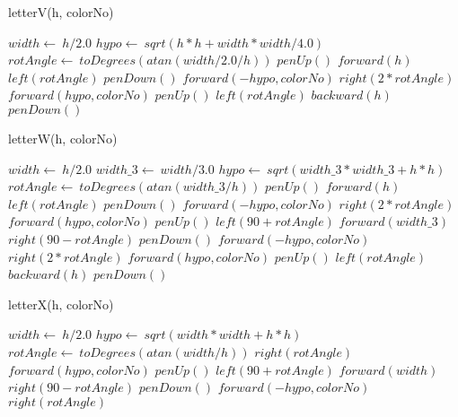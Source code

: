 \documentclass[a4paper,10pt]{article}
\begin{document}
\begin{algorithm}
\caption{letterV(h, colorNo)}
\begin{algorithmic}[5]

\STATE {}
\STATE {}
  \STATE \(width\gets\ h/2.0\)
  \STATE \(hypo\gets\ sqrt(h*h+width*width/4.0)\)
  \STATE \(rotAngle\gets\ toDegrees(atan(width/2.0/h))\)
  \STATE \(penUp()\)
  \STATE \(forward(h)\)
  \STATE \(left(rotAngle)\)
  \STATE \(penDown()\)
  \STATE \(forward(-hypo,colorNo)\)
  \STATE \(right(2*rotAngle)\)
  \STATE \(forward(hypo,colorNo)\)
  \STATE \(penUp()\)
  \STATE \(left(rotAngle)\)
  \STATE \(backward(h)\)
  \STATE \(penDown()\)

\end{algorithmic}
\end{algorithm}


\begin{algorithm}
\caption{letterW(h, colorNo)}
\begin{algorithmic}[5]

\STATE {}
\STATE {}
  \STATE \(width\gets\ h/2.0\)
  \STATE \(width\_3\gets\ width/3.0\)
  \STATE \(hypo\gets\ sqrt(width\_3*width\_3+h*h)\)
  \STATE \(rotAngle\gets\ toDegrees(atan(width\_3/h))\)
  \STATE \(penUp()\)
  \STATE \(forward(h)\)
  \STATE \(left(rotAngle)\)
  \STATE \(penDown()\)
  \STATE \(forward(-hypo,colorNo)\)
  \STATE \(right(2*rotAngle)\)
  \STATE \(forward(hypo,colorNo)\)
  \STATE \(penUp()\)
  \STATE \(left(90+rotAngle)\)
  \STATE \(forward(width\_3)\)
  \STATE \(right(90-rotAngle)\)
  \STATE \(penDown()\)
  \STATE \(forward(-hypo,colorNo)\)
  \STATE \(right(2*rotAngle)\)
  \STATE \(forward(hypo,colorNo)\)
  \STATE \(penUp()\)
  \STATE \(left(rotAngle)\)
  \STATE \(backward(h)\)
  \STATE \(penDown()\)

\end{algorithmic}
\end{algorithm}


\begin{algorithm}
\caption{letterX(h, colorNo)}
\begin{algorithmic}[5]

\STATE {}
\STATE {}
  \STATE \(width\gets\ h/2.0\)
  \STATE \(hypo\gets\ sqrt(width*width+h*h)\)
  \STATE \(rotAngle\gets\ toDegrees(atan(width/h))\)
  \STATE \(right(rotAngle)\)
  \STATE \(forward(hypo,colorNo)\)
  \STATE \(penUp()\)
  \STATE \(left(90+rotAngle)\)
  \STATE \(forward(width)\)
  \STATE \(right(90-rotAngle)\)
  \STATE \(penDown()\)
  \STATE \(forward(-hypo,colorNo)\)
  \STATE \(right(rotAngle)\)

\end{algorithmic}
\end{algorithm}
\end{document}
